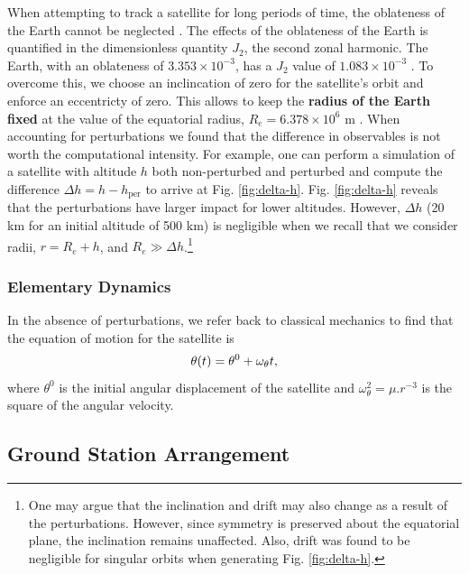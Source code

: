 When attempting to track a satellite for long periods of time, the oblateness of the Earth cannot be neglected \cite{bate1971}. The effects of the oblateness of the Earth is quantified in the dimensionless quantity $J_2$, the second zonal harmonic. The Earth, with an oblateness of $3.353 \times 10^{-3}$, has a $J_2$ value of $1.083 \times 10^{-3}$ \cite{curtis2005}. To overcome this, we choose an inclincation of zero for the satellite's orbit and enforce an eccentricty of zero. This allows to keep the \textbf{radius of the Earth fixed} at the value of the equatorial radius, $R_e = 6.378 \times 10^6$ m \cite{luzum2011}. When accounting for perturbations we found that the difference in observables is not worth the computational intensity. For example, one can perform a simulation of a satellite with altitude $h$ both non-perturbed and perturbed and compute the difference $\Delta h = h - h_{\text{per}}$ to arrive at Fig. \ref{fig:delta-h}. Fig. \ref{fig:delta-h} reveals that the perturbations have larger impact for lower altitudes. However, \(\Delta h\) (20 km for an initial altitude of 500 km) is negligible when we recall that we consider radii, $r = R_e + h$, and $R_e \gg \Delta h$.\footnote{One may argue that the inclination and drift may also change as a result of the perturbations. However, since symmetry is preserved about the equatorial plane, the inclination remains unaffected. Also, drift was found to be negligible for singular orbits when generating Fig. \ref{fig:delta-h}.}

\subsubsection{Elementary Dynamics}

In the absence of perturbations, we refer back to classical mechanics to find that the equation of motion for the satellite is
\begin{equation}\label{eq:eom-sat}
    \theta\qty(t) = \theta^0 + \omega_\theta t,
\end{equation}
where $\theta^0$ is the initial angular displacement of the satellite and $\omega_\theta^2 = \mu.r^{-3}$ is the square of the angular velocity.


\subsection{Ground Station Arrangement}

